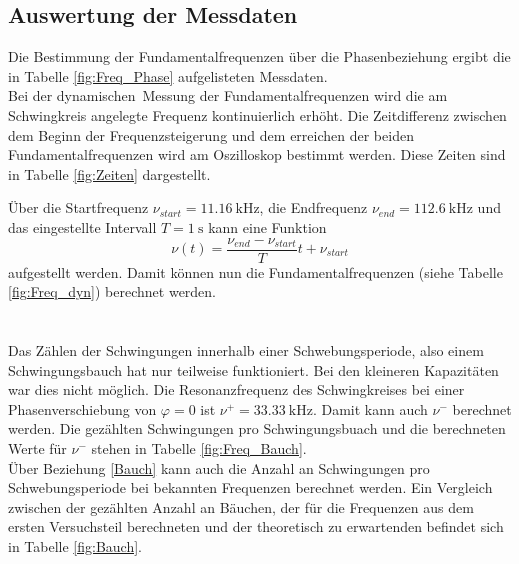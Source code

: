 \subsection{Auswertung der Messdaten}
Die Bestimmung der Fundamentalfrequenzen über die Phasenbeziehung ergibt die in Tabelle \ref{fig:Freq_Phase} aufgelisteten Messdaten.
 \\
Bei der \glqq dynamischen\grqq\ Messung der Fundamentalfrequenzen wird die am Schwingkreis angelegte Frequenz kontinuierlich erhöht. Die Zeitdifferenz zwischen dem Beginn der Frequenzsteigerung und dem erreichen der beiden Fundamentalfrequenzen wird am Oszilloskop bestimmt werden. Diese Zeiten sind in Tabelle \ref{fig:Zeiten} dargestellt.

Über die Startfrequenz $\nu_{start} = \SI{11.16}{\kilo\hertz}$, die Endfrequenz $\nu_{end} = \SI{112.6}{\kilo\hertz}$ und das eingestellte Intervall $T = \SI{1}{\second}$ kann eine Funktion
\[ \nu(t) = \frac{\nu_{end}-\nu_{start}}{T}t+\nu_{start} \]
aufgestellt werden. Damit können nun die Fundamentalfrequenzen (siehe Tabelle \ref{fig:Freq_dyn}) berechnet werden. \\

\ \\
\ \\
Das Zählen der Schwingungen innerhalb einer Schwebungsperiode, also einem Schwingungsbauch hat nur teilweise funktioniert. Bei den kleineren Kapazitäten war dies nicht möglich.
Die Resonanzfrequenz des Schwingkreises bei einer Phasenverschiebung von $\varphi=0$ ist $\nu^+=\SI{33.33}{\kilo\hertz}$. Damit kann auch $\nu^-$ berechnet werden. Die gezählten Schwingungen pro Schwingungsbuach und die berechneten Werte für $\nu^-$ stehen in Tabelle \ref{fig:Freq_Bauch}.
 \\
Über Beziehung \eqref{Bauch} kann auch die Anzahl an Schwingungen pro Schwebungsperiode bei bekannten Frequenzen berechnet werden. Ein Vergleich zwischen der gezählten Anzahl an Bäuchen, der für die Frequenzen aus dem ersten Versuchsteil berechneten und der theoretisch zu erwartenden befindet sich in Tabelle \ref{fig:Bauch}.


